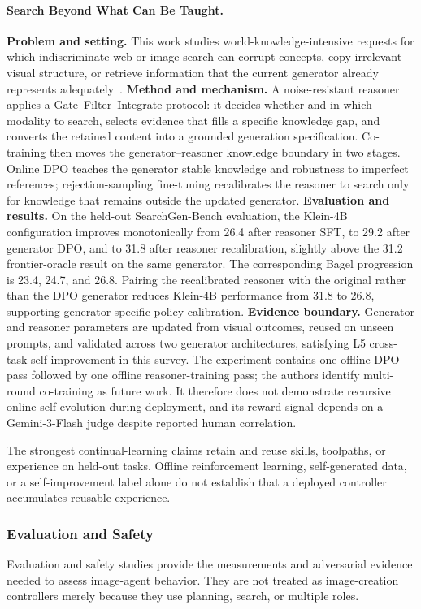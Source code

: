 \paragraph{Search Beyond What Can Be Taught.}
\textbf{Problem and setting.} This work studies world-knowledge-intensive requests for which indiscriminate web or image search can corrupt concepts, copy irrelevant visual structure, or retrieve information that the current generator already represents adequately~\cite{wang2026searchgen}. \textbf{Method and mechanism.} A noise-resistant reasoner applies a Gate--Filter--Integrate protocol: it decides whether and in which modality to search, selects evidence that fills a specific knowledge gap, and converts the retained content into a grounded generation specification. Co-training then moves the generator--reasoner knowledge boundary in two stages. Online DPO teaches the generator stable knowledge and robustness to imperfect references; rejection-sampling fine-tuning recalibrates the reasoner to search only for knowledge that remains outside the updated generator. \textbf{Evaluation and results.} On the held-out SearchGen-Bench evaluation, the Klein-4B configuration improves monotonically from 26.4 after reasoner SFT, to 29.2 after generator DPO, and to 31.8 after reasoner recalibration, slightly above the 31.2 frontier-oracle result on the same generator. The corresponding Bagel progression is 23.4, 24.7, and 26.8. Pairing the recalibrated reasoner with the original rather than the DPO generator reduces Klein-4B performance from 31.8 to 26.8, supporting generator-specific policy calibration. \textbf{Evidence boundary.} Generator and reasoner parameters are updated from visual outcomes, reused on unseen prompts, and validated across two generator architectures, satisfying L5 cross-task self-improvement in this survey. The experiment contains one offline DPO pass followed by one offline reasoner-training pass; the authors identify multi-round co-training as future work. It therefore does not demonstrate recursive online self-evolution during deployment, and its reward signal depends on a Gemini-3-Flash judge despite reported human correlation.

The strongest continual-learning claims retain and reuse skills, toolpaths, or experience on held-out tasks. Offline reinforcement learning, self-generated data, or a self-improvement label alone do not establish that a deployed controller accumulates reusable experience.

\subsubsection{Evaluation and Safety}
Evaluation and safety studies provide the measurements and adversarial evidence needed to assess image-agent behavior. They are not treated as image-creation controllers merely because they use planning, search, or multiple roles.

